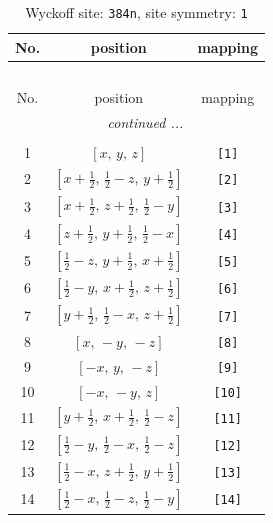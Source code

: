 \documentclass[fleqn,8pt]{jsarticle}
\begin{document}
\begin{longtable}{ccc}
\caption{Wyckoff site: {\tt 384n}, site symmetry: {\tt 1}}
 \\
 \hline \hline
No. & position & mapping \\ \hline \endfirsthead

\multicolumn{2}{l}{\tablename\ \thetable{}} \\
 \hline \hline
No. & position & mapping \\ \hline \endhead

 \hline \hline
\multicolumn{2}{r}{\footnotesize\it continued ...} \\ \endfoot

 \hline \hline
\multicolumn{2}{r}{} \\ \endlastfoot

1 & $\left[ x,\, y,\, z \right]$ & {\tt [1]} \\ \hline
2 & $\left[ x + \frac{1}{2},\, \frac{1}{2} - z,\, y + \frac{1}{2} \right]$ & {\tt [2]} \\ \hline
3 & $\left[ x + \frac{1}{2},\, z + \frac{1}{2},\, \frac{1}{2} - y \right]$ & {\tt [3]} \\ \hline
4 & $\left[ z + \frac{1}{2},\, y + \frac{1}{2},\, \frac{1}{2} - x \right]$ & {\tt [4]} \\ \hline
5 & $\left[ \frac{1}{2} - z,\, y + \frac{1}{2},\, x + \frac{1}{2} \right]$ & {\tt [5]} \\ \hline
6 & $\left[ \frac{1}{2} - y,\, x + \frac{1}{2},\, z + \frac{1}{2} \right]$ & {\tt [6]} \\ \hline
7 & $\left[ y + \frac{1}{2},\, \frac{1}{2} - x,\, z + \frac{1}{2} \right]$ & {\tt [7]} \\ \hline
8 & $\left[ x,\, - y,\, - z \right]$ & {\tt [8]} \\ \hline
9 & $\left[ - x,\, y,\, - z \right]$ & {\tt [9]} \\ \hline
10 & $\left[ - x,\, - y,\, z \right]$ & {\tt [10]} \\ \hline
11 & $\left[ y + \frac{1}{2},\, x + \frac{1}{2},\, \frac{1}{2} - z \right]$ & {\tt [11]} \\ \hline
12 & $\left[ \frac{1}{2} - y,\, \frac{1}{2} - x,\, \frac{1}{2} - z \right]$ & {\tt [12]} \\ \hline
13 & $\left[ \frac{1}{2} - x,\, z + \frac{1}{2},\, y + \frac{1}{2} \right]$ & {\tt [13]} \\ \hline
14 & $\left[ \frac{1}{2} - x,\, \frac{1}{2} - z,\, \frac{1}{2} - y \right]$ & {\tt [14]} \\ \hline

\end{longtable}
\end{document}
